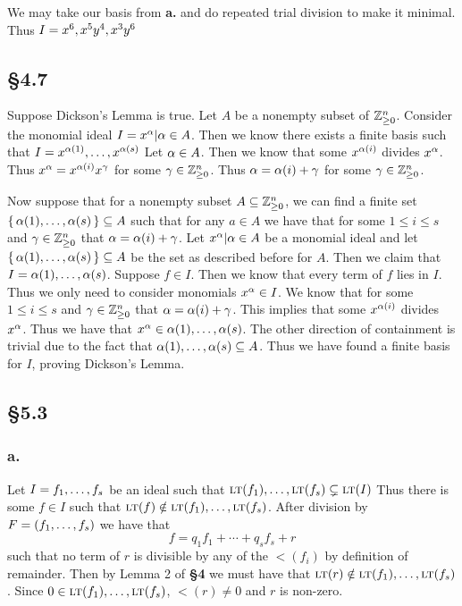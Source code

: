 \documentclass[letterpaper]{article}
\begin{document}
We may take our basis from \textbf{a.} and do repeated trial division to make it minimal. Thus $I = \gen{x^{6}, x^{5}y^{4}, x^{3}y^{6}}$

\subsection{\S 4.7}

Suppose Dickson's Lemma is true. Let $A$ be a nonempty subset of $\mathbb{Z}_{\geq 0}^{n}$. Consider the monomial ideal $I = \gen{x^{\a} | \a \in A}$. Then we know there exists a finite basis such that $I = \gen{x^{\a(1)}, \ldots, x^{\a(s)}}$ Let $\alpha \in A$. Then we know that some $x^{\alpha(i)}$ divides $x^{\alpha}$. Thus $x^{\alpha} = x^{\alpha(i)} x^{\gamma}$ for some $\gamma \in \mathbb{Z}_{\geq 0}^{n}$. Thus $\alpha = \alpha(i) + \gamma$ for some $\gamma \in \mathbb{Z}_{\geq 0}^{n}$.

Now suppose that for a nonempty subset $A \subseteq \mathbb{Z}_{\geq 0}^{n}$, we can find a finite set $\set{\alpha(1), \ldots, \alpha(s)} \subseteq A$ such that for any $a \in A$ we have that for some $1 \leq i \leq s$ and $\gamma \in \mathbb{Z}_{\geq 0}^{n}$ that $\alpha = \alpha(i) + \gamma$. Let $\gen{x^{\a} | \a \in A}$ be a monomial ideal and let $\set{\alpha(1), \ldots, \alpha(s)} \subseteq A$ be the set as described before for $A$. Then we claim that $I = \gen{\a(1), \ldots, \a(s)}$. Suppose $f \in I$. Then we know that every term of $f$ lies in $I$. Thus we only need to consider monomials $x^{\alpha} \in I$. We know that for some $1 \leq i \leq s$ and $\gamma \in \mathbb{Z}_{\geq 0}^{n}$ that $\alpha = \alpha(i) + \gamma$. This implies that some $x^{\alpha(i)}$ divides $x^{\alpha}$. Thus we have that $x^{\a} \in \gen{\a(1), \ldots, \a(s)}$. The other direction of containment is trivial due to the fact that $\gen{\a(1), \ldots, \a(s)} \subseteq A$. Thus we have found a finite basis for $I$, proving Dickson's Lemma.

\subsection{\S 5.3}

\subsubsection{a.}

Let $I = \gen{f_{1}, \ldots, f_{s}}$ be an ideal such that $\gen{\lt(f_{1}), \ldots, \lt(f_{s})} \subsetneq \gen{\lt(I)}$ Thus there is some $f \in I$ such that $\lt(f) \notin \gen{\lt(f_{1}), \ldots, \lt(f_{s})}$. After division by $F = \pqty{f_{1}, \ldots, f_{s}}$ we have that
\[
  f = q_{1}f_{1} + \cdots + q_{s}f_{s} + r
\]
such that no term of $r$ is divisible by any of the $\lt(f_{i})$ by definition of remainder. Then by Lemma 2 of \textbf{\S 4} we must have that $\lt(r) \notin \gen{\lt(f_{1}), \ldots, \lt(f_{s})}$. Since $0 \in \gen{\lt(f_{1}), \ldots, \lt(f_{s})}$, $\lt(r) \neq 0$ and $r$ is non-zero. 
\end{document}
